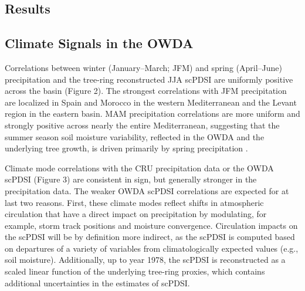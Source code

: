 \documentclass[draft,jgr]{AGUTeX}
\begin{document}
\begin{article}
\section{Results}
\subsection{Climate Signals in the OWDA}
\noindent Correlations between winter (January--March; JFM) and spring (April--June) precipitation and the tree-ring reconstructed JJA scPDSI are uniformly positive across the basin (Figure 2). The strongest correlations with JFM precipitation are localized in Spain and Morocco in the western Mediterranean and the Levant region in the eastern basin.  MAM precipitation correlations are more uniform and strongly positive across nearly the entire Mediterranean, suggesting that the summer season soil moisture variability, reflected in the OWDA and the underlying tree growth, is driven primarily by spring precipitation \citep[c.f.][]{Touchan:etal2014a}.

\indent Climate mode correlations with the CRU precipitation data or the OWDA scPDSI (Figure 3) are consistent in sign, but generally stronger in the precipitation data. The weaker OWDA scPDSI correlations are expected for at last two reasons. First, these climate modes reflect shifts in atmospheric circulation that have a direct impact on precipitation by modulating, for example, storm track positions and moisture convergence. Circulation impacts on the scPDSI will be by definition more indirect, as the scPDSI is computed based on departures of a variety of variables from climatologically expected values (e.g., soil moisture). Additionally, up to year 1978, the scPDSI is reconstructed as a scaled linear function of the underlying tree-ring proxies, which contains additional uncertainties in the estimates of scPDSI. 


\end{article}
\end{document}
